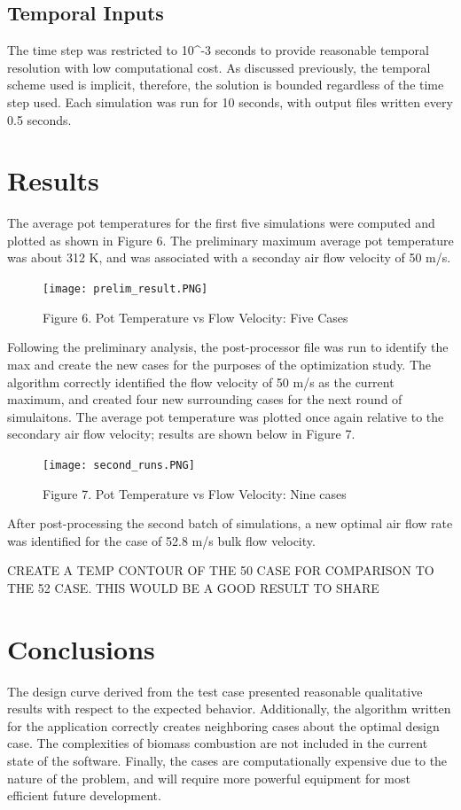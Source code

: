 \documentclass[3p,times,twocolumn]{elsarticle}
\begin{document}
\subsection{Temporal Inputs}
The time step was restricted to 10^{-3} seconds to provide reasonable temporal resolution with low computational cost. As discussed previously, the temporal scheme used is implicit, therefore, the solution is bounded regardless of the time step used. Each simulation was run for 10 seconds, with output files written every 0.5 seconds.

\section{Results}
The average pot temperatures for the first five simulations were computed and plotted as shown in Figure 6. The preliminary maximum average pot temperature was about 312 K, and was associated with a seconday air flow velocity of 50 m/s. 
\begin{figure}{\linewidth}
	\texttt{[image: prelim\_result.PNG]}
	\caption{Figure 6. Pot Temperature vs Flow Velocity: Five Cases}
\end{figure}


Following the preliminary analysis, the post-processor file was run to identify the max and create the new cases for the purposes of the optimization study. The algorithm correctly identified the flow velocity of 50 m/s as the current maximum, and created four new surrounding cases for the next round of simulaitons. The average pot temperature was plotted once again relative to the secondary air flow velocity; results are shown below in Figure 7.

\begin{figure}
	\texttt{[image: second\_runs.PNG]}
	\caption{Figure 7. Pot Temperature vs Flow Velocity: Nine cases}
\end{figure}


After post-processing the second batch of simulations, a new optimal air flow rate was identified for the case of 52.8 m/s bulk flow velocity.

CREATE A TEMP CONTOUR OF THE 50 CASE FOR COMPARISON TO THE 52 CASE. THIS WOULD BE A GOOD RESULT TO SHARE


\section{Conclusions}
The design curve derived from the test case presented reasonable qualitative results with respect to the expected behavior. Additionally, the algorithm written for the application correctly creates neighboring cases about the optimal design case. The complexities of biomass combustion are not included in the current state of the software. Finally, the cases are computationally expensive due to the nature of the problem, and will require more powerful equipment for most efficient future development.
\end{document}
